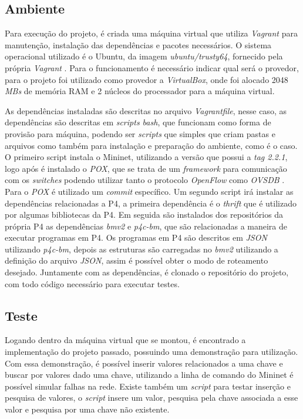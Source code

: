 \documentclass[
    12pt,
    openright, 
    oneside,
    a4paper,
    french,
    english,
    brazil
    ]{facom-ufu-abntex2}
\theoremstyle{definition}
\begin{document}
\subsection{Ambiente}
Para execução do projeto, é criada uma máquina virtual que utiliza \emph{Vagrant} para
manutenção, instalação das dependências e pacotes necessários. O sistema operacional
utilizado é o Ubuntu, da imagem \emph{ubuntu/trusty64}, fornecido pela própria
\emph{Vagrant} \cite{ubuntuTrusty}. Para o funcionamento é necessário indicar qual será
o provedor, para o projeto foi utilizado como provedor a \emph{VirtualBox}, onde foi
alocado 2048 \emph{MBs} de memória RAM e 2 núcleos do processador para a máquina
virtual.

As dependências instaladas são descritas no arquivo \emph{Vagrantfile}, nesse caso,
as dependências são descritas em \emph{scripts bash}, que funcionam como forma
de provisão para máquina, podendo ser \emph{scripts} que simples que criam pastas e arquivos
como também para instalação e preparação do ambiente, como é o caso. O primeiro script 
instala o Mininet, utilizando a versão que possui a \emph{tag 2.2.1}, logo após é instalado 
o \emph{POX}, que se trata de um \emph{framework} para comunicação com os \emph{switches} podendo 
utilizar tanto o protocolo \emph{OpenFlow} como \emph{OVSDB} \cite{poxWiki}. Para o \emph{POX} 
é utilizado um \emph{commit} específico. Um segundo script irá instalar as dependências 
relacionadas a P4, a primeira dependência é o \emph{thrift} que é utilizado por
algumas bibliotecas da P4. Em seguida são instalados dos repositórios da própria P4
as dependências \emph{bmv2} e \emph{p4c-bm}, que são relacionadas a maneira de executar programas em P4.
Os programas em P4 são descritos em \emph{JSON} utilizando \emph{p4c-bm}, depois as estruturas são 
carregadas no \emph{bmv2} utilizando a definição do arquivo \emph{JSON}, assim é possível obter o modo
de roteamento desejado. Juntamente com as dependências, é clonado o repositório do projeto, 
com todo código necessário para executar testes.

\subsection{Teste}

Logando dentro da máquina virtual que se montou, é encontrado a implementação do projeto
passado, possuindo uma demonstração para utilização. Com essa demonstração, é possível
inserir valores relacionados a uma chave e buscar por valores dado uma chave, utilizando
a linha de comando do Mininet é possível simular falhas na rede. Existe também um \emph{script}
para testar inserção e pesquisa de valores, o \emph{script} insere um valor, pesquisa pela chave
associada a esse valor e pesquisa por uma chave não existente.
\end{document}
